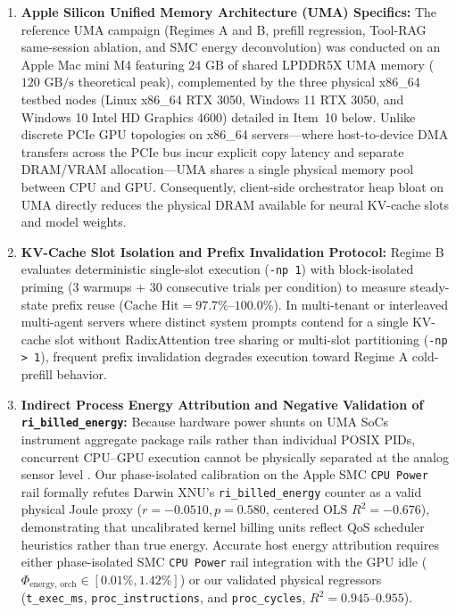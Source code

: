 \documentclass[11pt,a4paper]{article}
\begin{document}
\begin{enumerate}
    \item \textbf{Apple Silicon Unified Memory Architecture (UMA) Specifics:} The reference UMA campaign (Regimes A and B, prefill regression, Tool-RAG same-session ablation, and SMC energy deconvolution) was conducted on an Apple Mac mini M4 featuring $24\text{ GB}$ of shared LPDDR5X UMA memory ($120\text{ GB/s}$ theoretical peak), complemented by the three physical x86\_64 testbed nodes (Linux x86\_64 RTX 3050, Windows 11 RTX 3050, and Windows 10 Intel HD Graphics 4600) detailed in Item~10 below. Unlike discrete PCIe GPU topologies on x86\_64 servers---where host-to-device DMA transfers across the PCIe bus incur explicit copy latency and separate DRAM/VRAM allocation---UMA shares a single physical memory pool between CPU and GPU. Consequently, client-side orchestrator heap bloat on UMA directly reduces the physical DRAM available for neural KV-cache slots and model weights.
    \item \textbf{KV-Cache Slot Isolation and Prefix Invalidation Protocol:} Regime B evaluates deterministic single-slot execution (\texttt{-np 1}) with block-isolated priming (3 warmups + 30 consecutive trials per condition) to measure steady-state prefix reuse ($\text{Cache Hit} = 97.7\%\text{--}100.0\%$). In multi-tenant or interleaved multi-agent servers where distinct system prompts contend for a single KV-cache slot without RadixAttention tree sharing \cite{kwon2023vllm} or multi-slot partitioning (\texttt{-np > 1}), frequent prefix invalidation degrades execution toward Regime A cold-prefill behavior.
    \item \textbf{Indirect Process Energy Attribution and Negative Validation of \texttt{ri\_billed\_energy}:} Because hardware power shunts on UMA SoCs instrument aggregate package rails rather than individual POSIX PIDs, concurrent CPU--GPU execution cannot be physically separated at the analog sensor level \cite{fahad2019comparative, you2023zeus}. Our phase-isolated calibration on the Apple SMC \texttt{CPU Power} rail formally refutes Darwin XNU's \texttt{ri\_billed\_energy} counter as a valid physical Joule proxy ($r = -0.0510, p = 0.580$, centered $\text{OLS } R^2 = -0.676$), demonstrating that uncalibrated kernel billing units reflect QoS scheduler heuristics rather than true energy. Accurate host energy attribution requires either phase-isolated SMC \texttt{CPU Power} rail integration with the GPU idle ($\Phi_{\text{energy, orch}} \in [0.01\%, 1.42\%]$) or our validated physical regressors (\texttt{t\_exec\_ms}, \texttt{proc\_instructions}, and \texttt{proc\_cycles}, $R^2 = 0.945\text{--}0.955$).

\end{enumerate}
\end{document}
